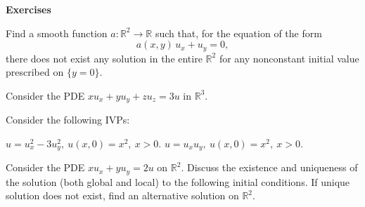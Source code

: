\documentclass[12pt]{exam}
\begin{document}
	\newpage
	\begin{center}
		\textbf{Exercises}
	\end{center}

	\begin{questions}

		\question Find a smooth function \( a : \mathbb{R}^2 \to \mathbb{R} \) such that, for the equation of the form
		\[a(x, y) \, u_x + u_y = 0,\]
		there does not exist any solution in the entire \( \mathbb{R}^2 \) for any nonconstant initial value prescribed on \( \{ y = 0 \} \).
		
		\question Consider the PDE $xu_x+yu_y+zu_z=3u$ in $\mathbb{R}^3$.
		
		\question Consider the following IVPs:
		\begin{choices}
			\choice $u=u_x^2-3u_y^2,\ u(x,0)=x^2,\ x>0$.
			\choice $u=u_xu_y,\ u(x,0)=x^2,\ x>0$.
		\end{choices}
		
		\question Consider the PDE $xu_x+yu_y=2u$ on $\mathbb{R}^2$. Discuss the existence and uniqueness of the solution (both global and local) to the following initial conditions. If unique solution does not exist, find an alternative solution on $\mathbb{R}^2$.
\end{questions}
\end{document}
